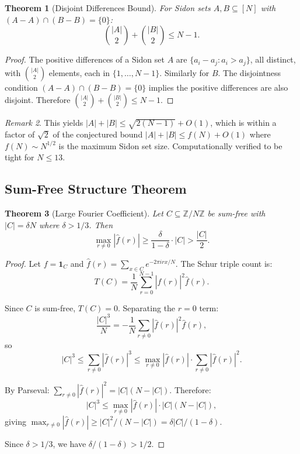\documentclass[11pt,a4paper]{article}
\newtheorem{theorem}{Theorem}[section]
\theoremstyle{definition}
\theoremstyle{remark}
\newtheorem{remark}[theorem]{Remark}
\begin{document}
\begin{theorem}[Disjoint Differences Bound]\label{thm:43-bound}
For Sidon sets $A, B \subseteq [N]$ with $(A-A) \cap (B-B) = \{0\}$:
$$\binom{|A|}{2} + \binom{|B|}{2} \leq N - 1.$$
\end{theorem}

\begin{proof}
The positive differences of a Sidon set $A$ are $\{a_i - a_j : a_i > a_j\}$,
all distinct, with $\binom{|A|}{2}$ elements, each in $\{1,\ldots,N-1\}$.
Similarly for $B$. The disjointness condition $(A-A) \cap (B-B) = \{0\}$
implies the positive differences are also disjoint. Therefore
$\binom{|A|}{2} + \binom{|B|}{2} \leq N - 1$.
\end{proof}

\begin{remark}
This yields $|A| + |B| \leq \sqrt{2(N-1)} + O(1)$, which is within a factor
of $\sqrt{2}$ of the conjectured bound $|A| + |B| \leq f(N) + O(1)$ where
$f(N) \sim N^{1/2}$ is the maximum Sidon set size. Computationally verified
to be tight for $N \leq 13$.
\end{remark}

\subsection{Sum-Free Structure Theorem}

\begin{theorem}[Large Fourier Coefficient]\label{thm:sum-free-fourier}
Let $C \subseteq \mathbb{Z}/N\mathbb{Z}$ be sum-free with $|C| = \delta N$
where $\delta > 1/3$. Then
$$\max_{r \neq 0} |\hat{f}(r)| \geq \frac{\delta}{1 - \delta} \cdot |C|
> \frac{|C|}{2}.$$
\end{theorem}

\begin{proof}
Let $f = \mathbf{1}_C$ and $\hat{f}(r) = \sum_{x \in C} e^{-2\pi i rx/N}$.
The Schur triple count is:
$$T(C) = \frac{1}{N} \sum_{r=0}^{N-1} |\hat{f}(r)|^2 \hat{f}(r).$$

Since $C$ is sum-free, $T(C) = 0$. Separating the $r=0$ term:
$$\frac{|C|^3}{N} = -\frac{1}{N} \sum_{r \neq 0} |\hat{f}(r)|^2 \hat{f}(r),$$
so
$$|C|^3 \leq \sum_{r \neq 0} |\hat{f}(r)|^3 \leq \max_{r \neq 0}|\hat{f}(r)|
\cdot \sum_{r \neq 0} |\hat{f}(r)|^2.$$

By Parseval: $\sum_{r \neq 0} |\hat{f}(r)|^2 = |C|(N - |C|)$. Therefore:
$$|C|^3 \leq \max_{r \neq 0}|\hat{f}(r)| \cdot |C|(N - |C|),$$
giving $\max_{r \neq 0}|\hat{f}(r)| \geq |C|^2/(N - |C|) = \delta|C|/(1-\delta)$.

Since $\delta > 1/3$, we have $\delta/(1-\delta) > 1/2$.
\end{proof}
\end{document}
